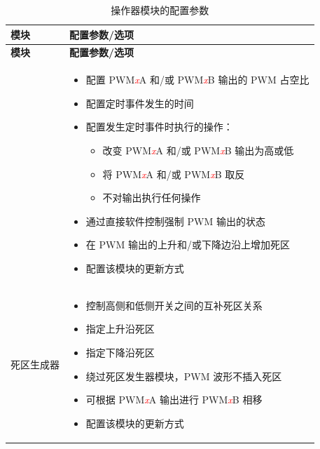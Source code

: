 \begin{longtable}[c]{|p{4cm}|p{11cm}|}
\caption{操作器模块的配置参数}
\label{tab:mcpwm-param-operator}
    \\\hline
    \rowcolor{lightgray}
 \textbf{模块} & \textbf{配置参数/选项} \\ \hline 

\endfirsthead\hline
 \rowcolor{lightgray}
 \textbf{模块} & \textbf{配置参数/选项}\\
 \hline 
\endhead
\endfoot

\multirow{10}{*}{PWM 生成器} &
    \vspace{-1em}
    \begin{itemize}
        \item 配置 PWM\textcolor{red}{\it{x}}A 和/或 PWM\textcolor{red}{\it{x}}B 输出的 PWM 占空比
        \item 配置定时事件发生的时间
        \item 配置发生定时事件时执行的操作：
        \begin{itemize}
           \item 改变 PWM\textcolor{red}{\it{x}}A 和/或 PWM\textcolor{red}{\it{x}}B 输出为高或低
           \item 将 PWM\textcolor{red}{\it{x}}A 和/或 PWM\textcolor{red}{\it{x}}B 取反
           \item 不对输出执行任何操作
        \end{itemize}
        \item 通过直接软件控制强制 PWM 输出的状态
        \item 在 PWM 输出的上升和/或下降边沿上增加死区
        \item 配置该模块的更新方式
     \vspace{-1em}\end{itemize} \\\hline
     
\multirow{7}{*}{死区生成器}  &
    \vspace{-1em}\begin{itemize}
        \item 控制高侧和低侧开关之间的互补死区关系
        \item 指定上升沿死区
        \item 指定下降沿死区
        \item 绕过死区发生器模块，PWM 波形不插入死区
        \item 可根据 PWM\textcolor{red}{\it{x}}A 输出进行 PWM\textcolor{red}{\it{x}}B 相移
        \item 配置该模块的更新方式
    \vspace{-1em}\end{itemize}\\\hline
    

\end{longtable}
